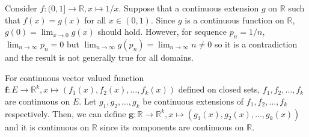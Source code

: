 \documentclass{scrartcl}
\begin{document}
Consider \(f : (0, 1] \to \mathbb{R}, x \mapsto 1 / x\).
Suppose that a continuous extension \(g\) on \(\mathbb{R}\) such that \(f(x) = g(x)\) for all \(x \in (0, 1)\).
Since \(g\) is a continuous function on \(\mathbb{R}\), \(g(0) = \lim_{x \to 0} g(x)\) should hold.
However, for sequence \(p_n = 1 / n\), \(\lim_{n \to \infty} p_n = 0\) but \(\lim_{n \to \infty} g(p_n) = \lim_{n \to \infty} n \not = 0\) so it is a contradiction and the result is not generally true for all domains.

For continuous vector valued function \(\mathbf{f} : E \to \mathbb{R}^k, x \mapsto (f_1(x), f_2(x), \dots, f_k(x))\) defined on closed sets, \(f_1, f_2, \dots, f_k\) are continuous on \(E\).
Let \(g_1, g_2, \dots, g_k\) be continuous extensions of \(f_1, f_2, \dots, f_k\) respectively.
Then, we can define \(\mathbf{g} : \mathbb{R} \to \mathbb{R}^k, x \mapsto (g_1(x), g_2(x), \dots, g_k(x))\) and it is continuous on \(\mathbb{R}\) since its components are continuous on \(\mathbb{R}\).
\end{document}
